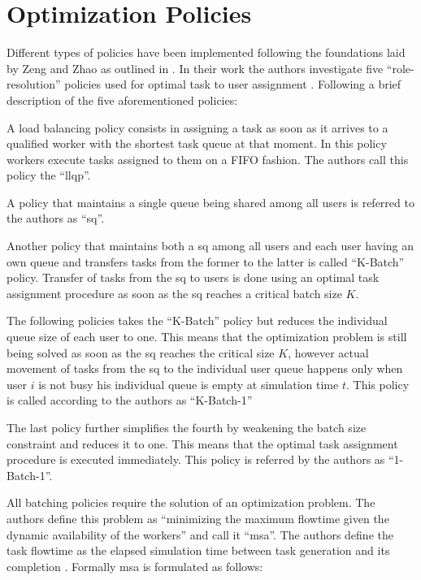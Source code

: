 \documentclass{seal_thesis}
\begin{document}

\section{Optimization Policies}
\label{sec:opt_policies}

Different types of policies have been implemented following the foundations laid by Zeng and Zhao as outlined in . In their work the authors investigate five ``role-resolution'' policies used for optimal task to user assignment \cite[p. 7]{Zeng2005}. Following a brief description of the five aforementioned policies:
\begin{enumerate*}
	\item A load balancing policy consists in assigning a task as soon as it arrives to a qualified worker with the shortest task queue at that moment. In this policy workers execute tasks assigned to them on a FIFO fashion. The authors call this policy the ``\gls{llqp}''.
	\item A policy that maintains a single queue being shared among all users is referred to the authors as ``\gls{sq}''.
	\item Another policy that maintains both a \gls{sq} among all users and each user having an own queue and transfers tasks from the former to the latter is called ``K-Batch'' policy. Transfer of tasks from the \gls{sq} to users is done using an optimal task assignment procedure as soon as the \gls{sq} reaches a critical batch size $K$.
	\item The following policies takes the ``K-Batch'' policy but reduces the individual queue size of each user to one. This means that the optimization problem is still being solved as soon as the \gls{sq} reaches the critical size $K$, however actual movement of tasks from the \gls{sq} to the individual user queue happens only when user $i$ is not busy \ie his individual queue is empty at simulation time $t$. This policy is called according to the authors as ``K-Batch-1''
	\item The last policy further simplifies the fourth by weakening the batch size constraint and reduces it to one. This means that the optimal task assignment procedure is executed immediately. This policy is referred by the authors as ``1-Batch-1''.
\end{enumerate*}

All batching policies require the solution of an optimization problem. The authors define this problem as ``minimizing the maximum flowtime given the dynamic availability of the workers'' and call it ``\gls{msa}''\cite[p. 7]{Zeng2005}. The authors define the task flowtime as the elapsed simulation time between task generation and its completion \cite{Zeng2005,Baker1974}. Formally \gls{msa} is formulated as follows:
\end{document}
